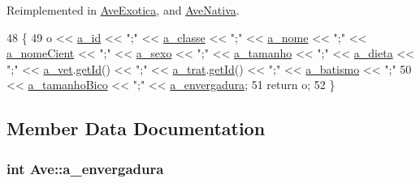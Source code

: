 Reimplemented in \hyperlink{classAveExotica_abe7b82c5cd14eefb532db19069fc9fcf}{Ave\+Exotica}, and \hyperlink{classAveNativa_a08a35d6ee2417ab7eebcdbf3b1d164ab}{Ave\+Nativa}.


\begin{DoxyCode}
48 \{
49     o << \hyperlink{classAnimal_a1eab12d1133a739dc0fea720cf6cc927}{a\_id} << \textcolor{stringliteral}{";"} << \hyperlink{classAnimal_a1f32b4455559489b5f5dce71913a6f8f}{a\_classe} << \textcolor{stringliteral}{";"} << \hyperlink{classAnimal_ad815bbe345d7c5274858ac8ccb24bc52}{a\_nome} << \textcolor{stringliteral}{";"} << 
      \hyperlink{classAnimal_af2ae0fc23b0eaf3edaee4579f6199dfc}{a\_nomeCient} << \textcolor{stringliteral}{";"} << \hyperlink{classAnimal_af2b1c520d145f82af7a5a88bb4271a0d}{a\_sexo} << \textcolor{stringliteral}{";"} << \hyperlink{classAnimal_a72366b060dfdbc0dd074fbe41decfcc2}{a\_tamanho} << \textcolor{stringliteral}{";"} << 
      \hyperlink{classAnimal_a32088524517a531af269e3ec04275135}{a\_dieta} << \textcolor{stringliteral}{";"} << \hyperlink{classAnimal_a12ce5681957e27dae674cbbde7fb1e4f}{a\_vet}.\hyperlink{classFuncionario_a0288286a907e587b7ab75d6c23354a06}{getId}() << \textcolor{stringliteral}{";"} << \hyperlink{classAnimal_a19fbf607b29b06a86f598dd1ffb8c712}{a\_trat}.\hyperlink{classFuncionario_a0288286a907e587b7ab75d6c23354a06}{getId}() << \textcolor{stringliteral}{";"} << 
      \hyperlink{classAnimal_a4e308163c5b3d82e546fb39b399bcb71}{a\_batismo} << \textcolor{stringliteral}{";"}
50     << \hyperlink{classAve_a4f544837b737e0a7984843033531f59f}{a\_tamanhoBico} << \textcolor{stringliteral}{";"} << \hyperlink{classAve_a755ef11f9c9bd778999b84856f42207d}{a\_envergadura};
51     \textcolor{keywordflow}{return} o;
52 \}
\end{DoxyCode}


\subsection{Member Data Documentation}
\subsubsection[{\texorpdfstring{a\+\_\+envergadura}{a_envergadura}}]{\setlength{\rightskip}{0pt plus 5cm}int Ave\+::a\+\_\+envergadura\hspace{0.3cm}{\ttfamily [protected]}}\hypertarget{classAve_a755ef11f9c9bd778999b84856f42207d}{}\label{classAve_a755ef11f9c9bd778999b84856f42207d}


